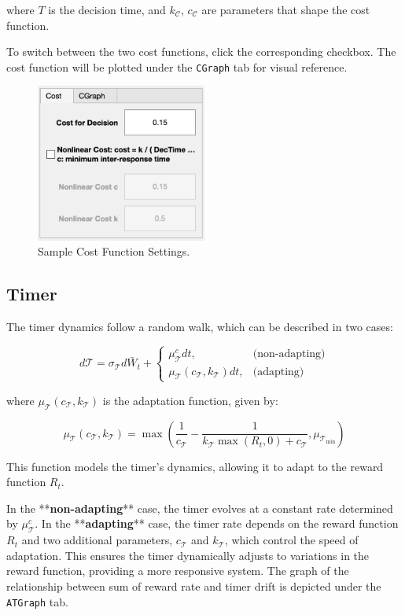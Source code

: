 where \(T\) is the decision time, and \(k_\mathcal{C}\), \(c_\mathcal{C}\) are parameters that shape the cost function.

To switch between the two cost functions, click the corresponding checkbox. The cost function will be plotted under the \texttt{CGraph} tab for visual reference.

\begin{figure}[H]
    \centering
    \includegraphics[width=0.5\textwidth]{figs/cost_settings.png}
    \caption{Sample Cost Function Settings.}
    \label{fig:cost_settings}
\end{figure}

\subsection{Timer}

The timer dynamics follow a random walk, which can be described in two cases:

\[
d\mathcal{T} = \sigma_\mathcal{T} d\bar{W}_t +
\begin{cases}
    \mu_\mathcal{T}^c dt , & \text{(non-adapting)} \\[15pt]
    \mu_\mathcal{T}(c_\mathcal{T},k_\mathcal{T}) dt , & \text{(adapting)}
\end{cases}
\]

where \( \mu_\mathcal{T}(c_\mathcal{T},k_\mathcal{T}) \) is the adaptation function, given by:

\[
\mu_\mathcal{T}(c_\mathcal{T},k_\mathcal{T}) = \max\left(\frac{1}{c_\mathcal{T}} - \frac{1}{k_\mathcal{T}\max\left(R_t, 0\right) + c_\mathcal{T}}, \mu_{\mathcal{T}_{\min}}\right)
\]

This function models the timer's dynamics, allowing it to adapt to the reward function \( R_t \). 

In the **\textbf{non-adapting}** case, the timer evolves at a constant rate determined by \( \mu_\mathcal{T}^c \). In the **\textbf{adapting}** case, the timer rate depends on the reward function \( R_t \) and two additional parameters, \( c_\mathcal{T} \) and \( k_\mathcal{T} \), which control the speed of adaptation. This ensures the timer dynamically adjusts to variations in the reward function, providing a more responsive system. The graph of the relationship between sum of reward rate and timer drift is depicted under the \texttt{ATGraph} tab.

